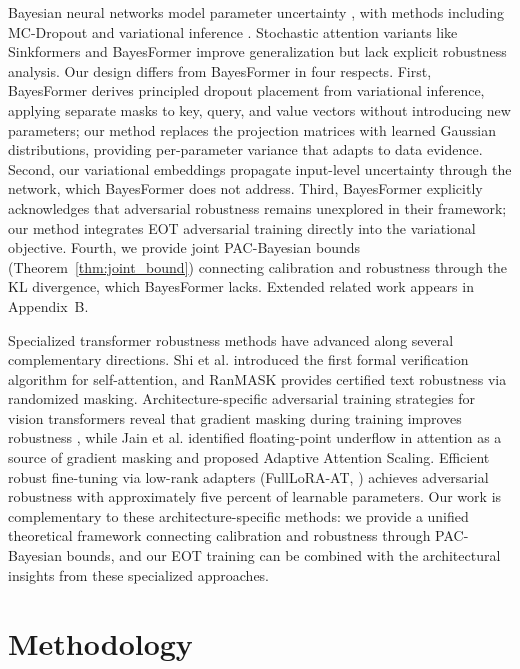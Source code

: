 \documentclass[12pt,a4paper]{article}
\theoremstyle{definition}
\begin{document}
Bayesian neural networks model parameter uncertainty \citep{abdar2021review}, with methods including MC-Dropout \citep{gal2016dropout} and variational inference \citep{blundell2015weight}. Stochastic attention variants like Sinkformers \citep{sander2023sinkformers} and BayesFormer \citep{sankararaman2022bayesformer} improve generalization but lack explicit robustness analysis. Our design differs from BayesFormer in four respects. First, BayesFormer derives principled dropout placement from variational inference, applying separate masks to key, query, and value vectors without introducing new parameters; our method replaces the projection matrices with learned Gaussian distributions, providing per-parameter variance that adapts to data evidence. Second, our variational embeddings propagate input-level uncertainty through the network, which BayesFormer does not address. Third, BayesFormer explicitly acknowledges that adversarial robustness remains unexplored in their framework; our method integrates EOT adversarial training directly into the variational objective. Fourth, we provide joint PAC-Bayesian bounds (Theorem~\ref{thm:joint_bound}) connecting calibration and robustness through the KL divergence, which BayesFormer lacks. Extended related work appears in Appendix~B.

Specialized transformer robustness methods have advanced along several complementary directions. Shi et al. \citep{shi2020robustness} introduced the first formal verification algorithm for self-attention, and RanMASK \citep{zeng2023ranmask} provides certified text robustness via randomized masking. Architecture-specific adversarial training strategies for vision transformers reveal that gradient masking during training improves robustness \citep{mo2022adversarial}, while Jain et al. \citep{jain2024towards} identified floating-point underflow in attention as a source of gradient masking and proposed Adaptive Attention Scaling. Efficient robust fine-tuning via low-rank adapters (FullLoRA-AT, \citealt{yuan2024fulllora}) achieves adversarial robustness with approximately five percent of learnable parameters. Our work is complementary to these architecture-specific methods: we provide a unified theoretical framework connecting calibration and robustness through PAC-Bayesian bounds, and our EOT training can be combined with the architectural insights from these specialized approaches.

\section{Methodology}
\end{document}
